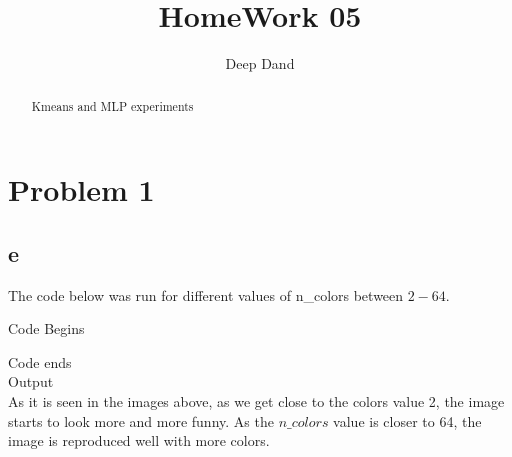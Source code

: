 \documentclass[10pt]{article}         %
\title{HomeWork 05}
\author{Deep Dand}
\begin{document}
\maketitle

\begin{abstract}
Kmeans and MLP experiments
\end{abstract}

\section{Problem 1}
\subsection{e}
The code below was run for different values of n\_colors between $2-64$. 

Code Begins

Code ends
\\Output\\
As it is seen in the images above, as we get close to the colors value 2, the image starts to look more and more funny. As the $n\_colors$ value is closer to 64, the image is reproduced well with more colors.
\end{document}
